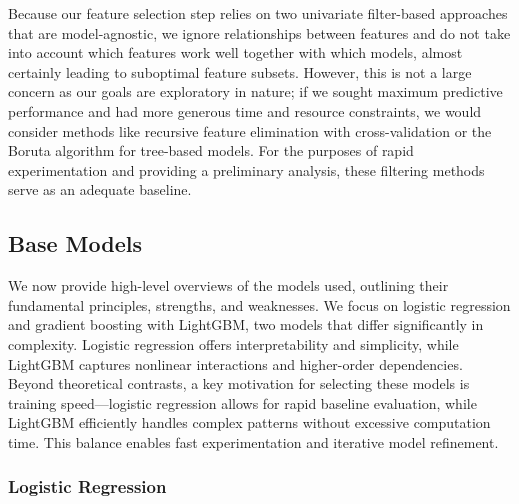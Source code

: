 \documentclass[12pt,twoside]{report}
\begin{document}
Because our feature selection step relies on two univariate filter-based approaches that are model-agnostic, we ignore relationships between features and do not take into account which features work well together with which models, almost certainly leading to suboptimal feature subsets. However, this is not a large concern as our goals are exploratory in nature; if we sought maximum predictive performance and had more generous time and resource constraints, we would consider methods like recursive feature elimination with cross-validation or the Boruta algorithm for tree-based models. For the purposes of rapid experimentation and providing a preliminary analysis, these filtering methods serve as an adequate baseline.

\subsection{Base Models}

We now provide high-level overviews of the models used, outlining their fundamental principles, strengths, and weaknesses. We focus on logistic regression and gradient boosting with LightGBM, two models that differ significantly in complexity. Logistic regression offers interpretability and simplicity, while LightGBM captures nonlinear interactions and higher-order dependencies. Beyond theoretical contrasts, a key motivation for selecting these models is training speed---logistic regression allows for rapid baseline evaluation, while LightGBM efficiently handles complex patterns without excessive computation time. This balance enables fast experimentation and iterative model refinement.

\subsubsection{Logistic Regression}
\end{document}
